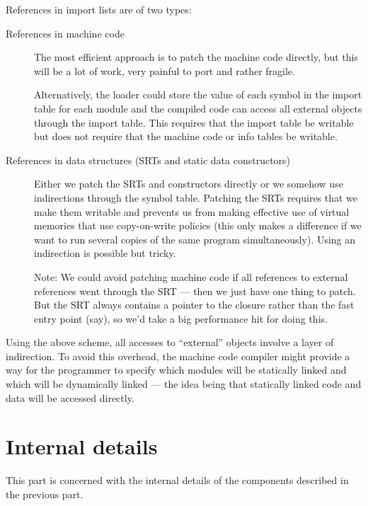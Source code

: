 \documentclass[11pt]{article}
\begin{document}
References in import lists are of two types:
\begin{description}
\item[ References in machine code ]

The most efficient approach is to patch the machine code directly, but
this will be a lot of work, very painful to port and rather fragile.

Alternatively, the loader could store the value of each symbol in the
import table for each module and the compiled code can access all
external objects through the import table.  This requires that the
import table be writable but does not require that the machine code or
info tables be writable.

\item[ References in data structures (SRTs and static data constructors) ]

Either we patch the SRTs and constructors directly or we somehow use
indirections through the symbol table.  Patching the SRTs requires
that we make them writable and prevents us from making effective use
of virtual memories that use copy-on-write policies (this only makes a
difference if we want to run several copies of the same program
simultaneously).  Using an indirection is possible but tricky.

Note: We could avoid patching machine code if all references to
external references went through the SRT --- then we just have one
thing to patch.  But the SRT always contains a pointer to the closure
rather than the fast entry point (say), so we'd take a big performance
hit for doing this.

\end{description}

Using the above scheme, all accesses to ``external'' objects involve a
layer of indirection.  To avoid this overhead, the machine code
compiler might provide a way for the programmer to specify which
modules will be statically linked and which will be dynamically linked
--- the idea being that statically linked code and data will be
accessed directly.


\part{Internal details}

This part is concerned with the internal details of the components
described in the previous part.
\end{document}
